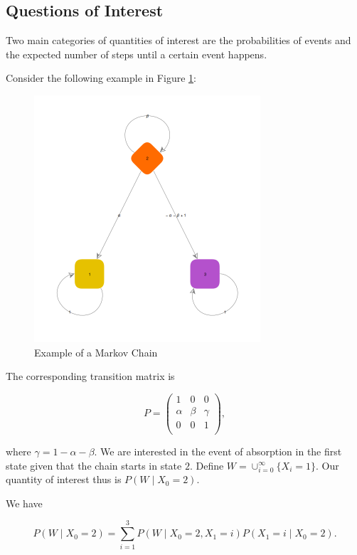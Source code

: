 \documentclass{article}
\theoremstyle{definition}
\begin{document}
\subsection{Questions of Interest}
Two main categories of quantities of interest are the probabilities of events and the expected number of steps until a certain event happens. 

Consider the following example in Figure \ref{fig:interest_plot01}:

\begin{figure}[h!]
\centering
\includegraphics[width=0.75\textwidth]{images/interestPlot01}
\caption{Example of a Markov Chain}
\label{fig:interest_plot01}
\end{figure}

The corresponding transition matrix is 

$$
P = \begin{pmatrix}
1 & 0 & 0 \\
\alpha & \beta & \gamma  \\
0 & 0 & 1 \\
\end{pmatrix},
$$

where $\gamma = 1 - \alpha - \beta$. We are interested in the event of absorption in the first state given that the chain starts in state $2$. Define $ W= \cup_{i=0}^\infty \{X_i = 1\}$. Our quantity of interest thus is $P(W \mid X_0 = 2)$. 

We have

$$
P(W \mid X_0 = 2) = \sum_{i=1}^3 P(W \mid X_0 = 2, X_1 = i) P(X_1 = i \mid X_0 = 2).
$$
\end{document}
